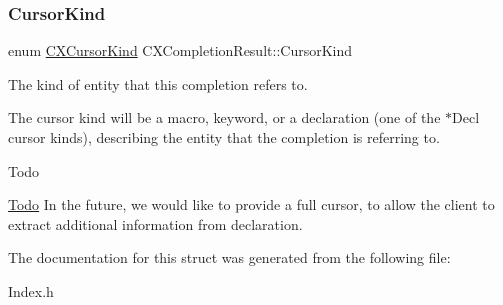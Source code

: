 \subsubsection{\texorpdfstring{Cursor\+Kind}{CursorKind}}
{\footnotesize\ttfamily enum \mbox{\hyperlink{group__CINDEX_gaaccc432245b4cd9f2d470913f9ef0013}{C\+X\+Cursor\+Kind}} C\+X\+Completion\+Result\+::\+Cursor\+Kind}



The kind of entity that this completion refers to. 

The cursor kind will be a macro, keyword, or a declaration (one of the $\ast$\+Decl cursor kinds), describing the entity that the completion is referring to.

\begin{DoxyRefDesc}{Todo}
\item[\mbox{\hyperlink{todo__todo000001}{Todo}}]In the future, we would like to provide a full cursor, to allow the client to extract additional information from declaration. \end{DoxyRefDesc}


The documentation for this struct was generated from the following file\+:\begin{DoxyCompactItemize}
\item 
Index.\+h\end{DoxyCompactItemize}
